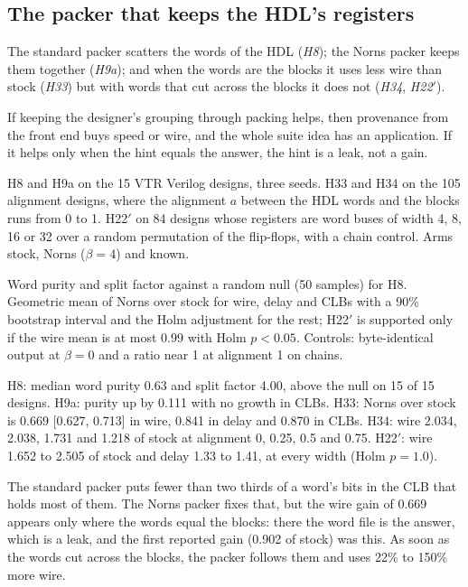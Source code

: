 \subsection{The packer that keeps the HDL's registers}
\label{sec:r-packer}

 The standard packer scatters the words of the HDL (\emph{H8}); the Norns packer keeps them together (\emph{H9a}); and when the words are the blocks it uses less wire than stock (\emph{H33}) but with words that cut across the blocks it does not (\emph{H34}, \emph{H22$'$}).

 If keeping the designer's grouping through packing helps, then provenance from the front end buys speed or wire, and the whole suite idea has an application. If it helps only when the hint equals the answer, the hint is a leak, not a gain.

 H8 and H9a on the 15 VTR Verilog designs, three seeds. H33 and H34 on the 105 alignment designs, where the alignment $a$ between the HDL words and the blocks runs from 0 to 1. H22$'$ on 84 designs whose registers are word buses of width 4, 8, 16 or 32 over a random permutation of the flip-flops, with a chain control. Arms stock, Norns ($\beta=4$) and known.

 Word purity and split factor against a random null (50 samples) for H8. Geometric mean of Norns over stock for wire, delay and CLBs with a 90\% bootstrap interval and the Holm adjustment for the rest; H22$'$ is supported only if the wire mean is at most 0.99 with Holm $p<0.05$. Controls: byte-identical output at $\beta=0$ and a ratio near 1 at alignment 1 on chains.

 H8: median word purity 0.63 and split factor 4.00, above the null on 15 of 15 designs. H9a: purity up by 0.111 with no growth in CLBs. H33: Norns over stock is 0.669 [0.627, 0.713] in wire, 0.841 in delay and 0.870 in CLBs. H34: wire 2.034, 2.038, 1.731 and 1.218 of stock at alignment 0, 0.25, 0.5 and 0.75. H22$'$: wire 1.652 to 2.505 of stock and delay 1.33 to 1.41, at every width (Holm $p=1.0$).

 The standard packer puts fewer than two thirds of a word's bits in the CLB that holds most of them. The Norns packer fixes that, but the wire gain of 0.669 appears only where the words equal the blocks: there the word file is the answer, which is a leak, and the first reported gain (0.902 of stock) was this. As soon as the words cut across the blocks, the packer follows them and uses 22\% to 150\% more wire.

